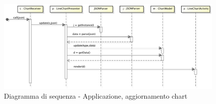             
            \begin{figure}[H]
                \centering
                \includegraphics[scale=0.3]{DefinizioneDiProdotto/Pics/ApplicazioneAggiornamentoChart}
                \caption{Diagramma di sequenza - Applicazione, aggiornamento chart}
            \end{figure}
